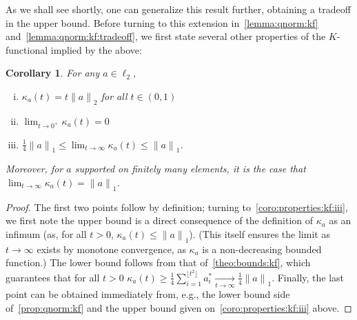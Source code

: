 \documentclass[11pt]{article}
\newtheorem{corollary}[coro]{Corollary}
\theoremstyle{remark}   	\newtheorem{remark}[theorem]{Remark}
\theoremstyle{definition}   	\newaliascnt{defn}{theorem}
\newcommand{\norm}[1]{\lVert#1{\rVert}}
\newcommand{\normone}[1]{{\norm{#1}}_1}
\newcommand{\normtwo}[1]{{\norm{#1}}_2}
\newcommand{\lp}[1][1]{\ell_{#1}}
\newcommand{\kf}[1]{\kappa_{#1}}
\begin{document}
As we shall see shortly, one can generalize this result further, obtaining a tradeoff in the upper bound. Before turning to this extension in~\autoref{lemma:qnorm:kf} and~\autoref{lemma:qnorm:kf:tradeoff}, we first state several other properties of the $K$-functional implied by the above:
\begin{corollary}\label{coro:properties:kf}
For any $a\in\lp[2]$,
\begin{enumerate}[(i)]
  \item $\kf{a}(t) = t\normtwo{a}$ for all $t\in(0,1)$
  \item $\lim_{t\to0^+} \kf{a}(t) = 0$
  \item\label{coro:properties:kf:iii} $\frac{1}{4} \normone{a} \leq \lim_{t\to\infty} \kf{a}(t) \leq \normone{a}$.
\end{enumerate}
Moreover, for $a$ supported on finitely many elements, it is the case that $\lim_{t\to\infty} \kf{a}(t) = \normone{a}$.
\end{corollary}
\begin{proof}
The first two points follow by definition; turning to~\autoref{coro:properties:kf:iii}, we first note the upper bound is a direct consequence of the definition of $\kf{a}$ as an infimum (as, for all $t>0$, $\kf{a}(t)\leq \normone{a}$). (This itself ensures the limit as $t\to\infty$ exists by monotone convergence, as $\kf{a}$ is a non-decreasing bounded function.) The lower bound follows from that of~\autoref{theo:bounds:kf}, which guarantees that for all $t>0$ $\kf{a}(t)\geq \frac{1}{4}\sum_{i=1}^{\lfloor{t^2}\rfloor} a_i^\ast \xrightarrow[t\to\infty]{} \frac{1}{4}\normone{a}$. Finally, the last point  can be obtained immediately from, e.g., the lower bound side of~\autoref{prop:qnorm:kf} and the upper bound given on~\autoref{coro:properties:kf:iii}  above.
\end{proof}
\end{document}
